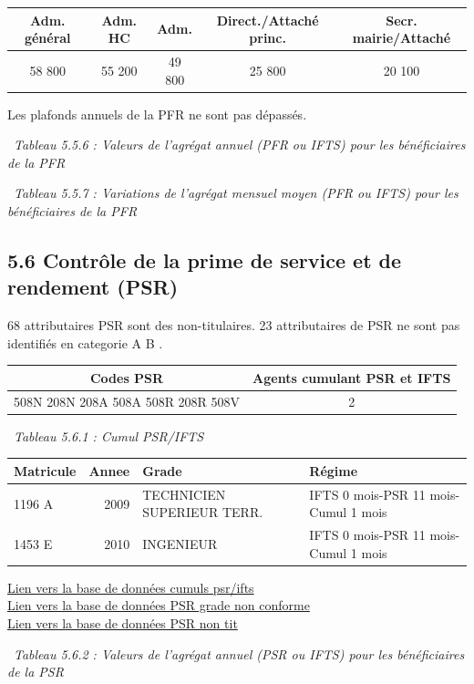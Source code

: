\begin{longtable}[]{@{}ccccc@{}}
\toprule
Adm. général & Adm. HC & Adm. & Direct./Attaché princ. & Secr.
mairie/Attaché\tabularnewline
\midrule
\endhead
58 800 & 55 200 & 49 800 & 25 800 & 20 100\tabularnewline
\bottomrule
\end{longtable}

Les plafonds annuels de la PFR ne sont pas dépassés.

~\emph{Tableau 5.5.6 : Valeurs de l'agrégat annuel (PFR ou IFTS) pour
les bénéficiaires de la PFR}

~\emph{Tableau 5.5.7 : Variations de l'agrégat mensuel moyen (PFR ou
IFTS) pour les bénéficiaires de la PFR}

\hypertarget{controle-de-la-prime-de-service-et-de-rendement-psr}{%
\subsection{5.6 Contrôle de la prime de service et de rendement
(PSR)}\label{controle-de-la-prime-de-service-et-de-rendement-psr}}

68 attributaires PSR sont des non-titulaires. 23 attributaires de PSR ne
sont pas identifiés en categorie A B .

\begin{longtable}[]{@{}cc@{}}
\toprule
Codes PSR & Agents cumulant PSR et IFTS\tabularnewline
\midrule
\endhead
508N 208N 208A 508A 508R 208R 508V & 2\tabularnewline
\bottomrule
\end{longtable}

~\emph{Tableau 5.6.1 : Cumul PSR/IFTS}

\begin{longtable}[]{@{}lrll@{}}
\toprule
Matricule & Annee & Grade & Régime\tabularnewline
\midrule
\endhead
1196 A & 2009 & TECHNICIEN SUPERIEUR TERR. & IFTS 0 mois-PSR 11
mois-Cumul 1 mois\tabularnewline
1453 E & 2010 & INGENIEUR & IFTS 0 mois-PSR 11 mois-Cumul 1
mois\tabularnewline
\bottomrule
\end{longtable}

\href{../Bases/Reglementation/personnels.psr.ifts.csv}{Lien vers la base de
données cumuls psr/ifts}\\
\href{../Bases/Reglementation/PSR.non.catAB.csv}{Lien vers la base de
données PSR grade non conforme}\\
\href{../Bases/Reglementation/PSR.non.tit.csv}{Lien vers la base de données
PSR non tit}

~\emph{Tableau 5.6.2 : Valeurs de l'agrégat annuel (PSR ou IFTS) pour
les bénéficiaires de la PSR}

